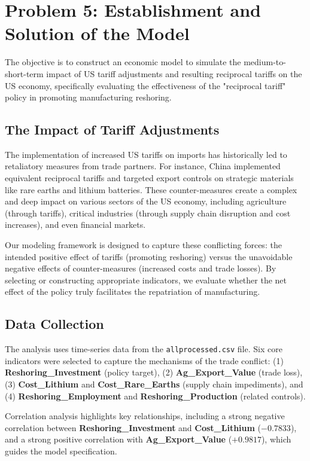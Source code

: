 \documentclass{apmcmthesis}
\begin{document}
\section{Problem 5: Establishment and Solution of the Model}

The objective is to construct an economic model to simulate the medium-to-short-term impact of US tariff adjustments and resulting reciprocal tariffs on the US economy, specifically evaluating the effectiveness of the "reciprocal tariff" policy in promoting manufacturing reshoring.

\subsection{The Impact of Tariff Adjustments}
The implementation of increased US tariffs on imports has historically led to retaliatory measures from trade partners. For instance, China implemented equivalent reciprocal tariffs and targeted export controls on strategic materials like rare earths and lithium batteries. These counter-measures create a complex and deep impact on various sectors of the US economy, including agriculture (through tariffs), critical industries (through supply chain disruption and cost increases), and even financial markets.

Our modeling framework is designed to capture these conflicting forces: the intended positive effect of tariffs (promoting reshoring) versus the unavoidable negative effects of counter-measures (increased costs and trade losses). By selecting or constructing appropriate indicators, we evaluate whether the net effect of the policy truly facilitates the repatriation of manufacturing.

\subsection{Data Collection}
The analysis uses time-series data from the \texttt{allprocessed.csv} file. Six core indicators were selected to capture the mechanisms of the trade conflict: (1) \textbf{Reshoring\_Investment} (policy target), (2) \textbf{Ag\_Export\_Value} (trade loss), (3) \textbf{Cost\_Lithium} and \textbf{Cost\_Rare\_Earths} (supply chain impediments), and (4) \textbf{Reshoring\_Employment} and \textbf{Reshoring\_Production} (related controls).

Correlation analysis highlights key relationships, including a strong negative correlation between \textbf{Reshoring\_Investment} and \textbf{Cost\_Lithium} ($-0.7833$), and a strong positive correlation with \textbf{Ag\_Export\_Value} ($+0.9817$), which guides the model specification.
\end{document}
